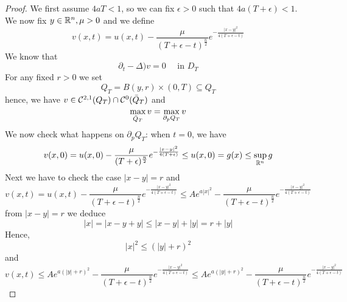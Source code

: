 \begin{ProofBox}
    \begin{proof}
        We first assume $4aT < 1$, so we can fix $\epsilon > 0$ such that $4a(T+\epsilon) < 1$. \\
        We now fix $y \in \mathbb{R}^n, \mu > 0$ and we define 
        \begin{equation*}
            v(x,t) = u(x,t) - \frac{\mu}{(T+\epsilon - t)^\frac{n}{2}}e^{-\frac{|x-y|^2}{4(T+\epsilon-t)}}
        \end{equation*}
        We know that 
        \begin{equation*}
            \partial_t - \Delta) v = 0 \quad \text{ in } D_T
        \end{equation*}
        For any fixed $r > 0$ we set 
        \begin{equation*}
            Q_T = B(y,r) \times (0,T) \subseteq Q_T
        \end{equation*}
        hence, we have $v \in \mathcal{C}^{2,1}(Q_T) \cap \mathcal{C}^0(\Bar{Q}_T)$ and 
        \begin{equation*}
            \max_{\Bar{Q}_T} v = \max_{ \partial_p Q_T} v
        \end{equation*}
        We now check what happens on $ \partial_p Q_T$: when $t= 0$, we have
        \begin{equation*}
            v(x,0) = u(x,0) -\frac{\mu}{(T+\epsilon)^\frac{n}{2}} e^{-\frac{|x-y|^2}{4(T+\epsilon)}}\leq u(x,0) = g(x) \leq \sup_{\mathbb{R}^n}g
        \end{equation*}
        Next we have to check the case $|x-y|=r$ and \begin{equation*}
            v(x,t) = u(x,t) - \frac{\mu}{(T+\epsilon - t)^\frac{n}{2}} e^{-\frac{|x-y|^2}{4(T+\epsilon - t)}} \leq A e^{a |x|^2} - \frac{\mu}{(T+\epsilon - t)^\frac{n}{2}} e^{-\frac{|x-y|^2}{4(T+\epsilon - t)}} 
        \end{equation*}
        from $|x-y|=r$ we deduce 
        \begin{equation*}
            |x| = |x-y+y| \leq |x-y| + |y| = r + |y|
        \end{equation*}
        Hence,
        \begin{equation*}
            |x|^2 \leq (|y|+r)^2
        \end{equation*}
        and
        \begin{equation*}
            v(x,t) \leq Ae^{a (|y| +r)^2} - \frac{\mu}{(T+\epsilon - t)^\frac{n}{2}} e^{-\frac{|x-y|^2}{4(T+\epsilon - t)}} \leq A e^{a(|y|+r)^2} - \frac{\mu}{(T+\epsilon - t)^\frac{n}{2}} e^{-\frac{|x-y|^2}{4(T+\epsilon - t)}}

\end{equation*}
\end{proof}
\end{ProofBox}
